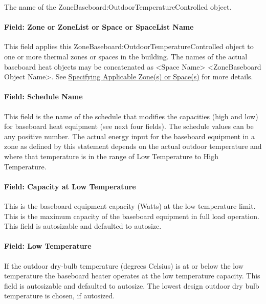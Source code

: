 The name of the ZoneBaseboard:OutdoorTemperatureControlled object.

\paragraph{Field: Zone or ZoneList or Space or SpaceList Name}\label{bbheat-field-zone-or-zonelist-name-000}

This field applies this ZoneBaseboard:OutdoorTemperatureControlled object to one or more thermal zones or spaces in the building. The names of the actual baseboard heat objects may be concatenated as \textless{}Space Name\textgreater{} \textless{}ZoneBaseboard Object Name\textgreater{}. See \hyperref[specifying-applicable-zones-or-spaces]{Specifying Applicable Zone(s) or Space(s)} for more details.

\paragraph{Field: Schedule Name}\label{field-schedule-name-11}

This field is the name of the schedule that modifies the capacities (high and low) for baseboard heat equipment (see next four fields). The schedule values can be any positive number. The actual energy input for the baseboard equipment in a zone as defined by this statement depends on the actual outdoor temperature and where that temperature is in the range of Low Temperature to High Temperature.

\paragraph{Field: Capacity at Low Temperature}\label{field-capacity-at-low-temperature}

This is the baseboard equipment capacity (Watts) at the low temperature limit. This is the maximum capacity of the baseboard equipment in full load operation. This field is autosizable and defaulted to autosize.

\paragraph{Field: Low Temperature}\label{field-low-temperature}

If the outdoor dry-bulb temperature (degrees Celsius) is at or below the low temperature the baseboard heater operates at the low temperature capacity. This field is autosizable and defaulted to autosize. The lowest design outdoor dry bulb temperature is chosen, if autosized.

